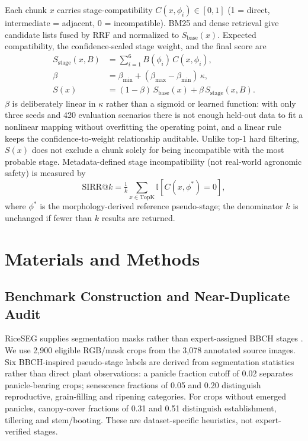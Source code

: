 \documentclass[conference,a4paper]{IEEEtran}
\begin{document}
Each chunk $x$ carries stage-compatibility $C(x,\phi_i) \in [0,1]$ (1 = direct, intermediate = adjacent, 0 = incompatible). BM25 and dense retrieval give candidate lists fused by RRF and normalized to $S_{\mathrm{base}}(x)$. Expected compatibility, the confidence-scaled stage weight, and the final score are
\begin{equation}
\begin{aligned}
S_{\mathrm{stage}}(x,B) &= \sum_{i=1}^{6} B(\phi_i)\, C(x,\phi_i), \\
\beta &= \beta_{\min} + (\beta_{\max}-\beta_{\min})\,\kappa, \\
S(x) &= (1-\beta)\, S_{\mathrm{base}}(x) + \beta\, S_{\mathrm{stage}}(x,B).
\end{aligned}
\label{eq:score}
\end{equation}
$\beta$ is deliberately linear in $\kappa$ rather than a sigmoid or learned function: with only three seeds and 420 evaluation scenarios there is not enough held-out data to fit a nonlinear mapping without overfitting the operating point, and a linear rule keeps the confidence-to-weight relationship auditable. Unlike top-1 hard filtering, $S(x)$ does not exclude a chunk solely for being incompatible with the most probable stage. Metadata-defined stage incompatibility (not real-world agronomic safety) is measured by
\begin{equation}
\mathrm{SIRR@}k = \tfrac{1}{k}\sum_{x \in \mathrm{TopK}} \mathbb{I}[C(x,\phi^*)=0],
\label{eq:sirr}
\end{equation}
where $\phi^*$ is the morphology-derived reference pseudo-stage; the denominator $k$ is unchanged if fewer than $k$ results are returned.

\section{Materials and Methods}

\subsection{Benchmark Construction and Near-Duplicate Audit}

RiceSEG supplies segmentation masks rather than expert-assigned BBCH stages \cite{zhou2025riceseg}. We use 2{,}900 eligible RGB/mask crops from the 3{,}078 annotated source images. Six BBCH-inspired pseudo-stage labels are derived from segmentation statistics rather than direct plant observations: a panicle fraction cutoff of 0.02 separates panicle-bearing crops; senescence fractions of 0.05 and 0.20 distinguish reproductive, grain-filling and ripening categories. For crops without emerged panicles, canopy-cover fractions of 0.31 and 0.51 distinguish establishment, tillering and stem/booting. These are dataset-specific heuristics, not expert-verified stages.
\end{document}
